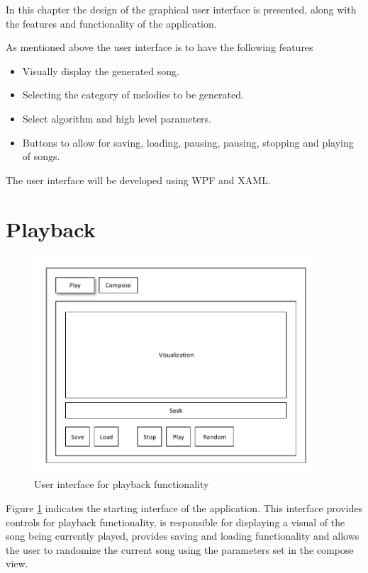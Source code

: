 In this chapter the design of the graphical user interface is presented, along with the features and functionality of the application.

As mentioned above the user interface is to have the following features
\begin{itemize}
\item Visually display the generated song.
\item Selecting the category of melodies to be generated.
\item Select algorithm and high level parameters.
\item Buttons to allow for saving, loading, pausing, pausing, stopping and playing of songs.
\end{itemize}

The user interface will be developed using \ac{WPF} and \ac{XAML}.

\section{Playback}

\begin{figure}
\centerline{\includegraphics[width=400px]{../images/ui_play.pdf}}
\caption{User interface for playback functionality}
\label{ims:uiplay}
\end{figure}



Figure \ref{ims:uiplay} indicates the starting interface of the application. This interface provides controls for playback functionality, is responsible for displaying a visual of the song being currently played, provides saving and loading functionality and allows the user to randomize the current song using the parameters set in the compose view.

